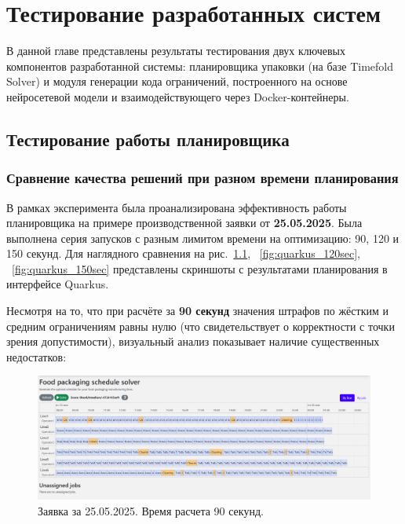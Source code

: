 \chapter{Тестирование разработанных систем}
\label{ch:chapter5}

В данной главе представлены результаты тестирования двух ключевых компонентов разработанной системы: планировщика упаковки (на базе Timefold Solver) и модуля генерации кода ограничений, построенного на основе нейросетевой модели и взаимодействующего через Docker-контейнеры.

\section{Тестирование работы планировщика}

\subsection{Сравнение качества решений при разном времени планирования}

В рамках эксперимента была проанализирована эффективность работы планировщика на примере производственной заявки от \textbf{25.05.2025}. Была выполнена серия запусков с разным лимитом времени на оптимизацию: 90, 120 и 150 секунд. Для наглядного сравнения на рис.~\ref{fig:quarkus_90sec}, ~\ref{fig:quarkus_120sec}, ~\ref{fig:quarkus_150sec} представлены скриншоты с результатами планирования в интерфейсе Quarkus.

Несмотря на то, что при расчёте за \textbf{90 секунд} значения штрафов по жёстким и средним ограничениям равны нулю (что свидетельствует о корректности с точки зрения допустимости), визуальный анализ показывает наличие существенных недостатков:

\begin{figure}[ht]
 \centering
        \includegraphics[height = 6 cm, keepaspectratio]{../assets/images/tests/90sec.png}
		\caption{Заявка за 25.05.2025. Время расчета 90 секунд.}
		\label{fig:quarkus_90sec}
\end{figure}

